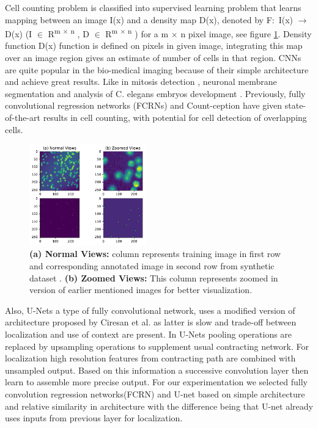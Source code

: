 \documentclass[conference]{IEEEtran}
\begin{document}
Cell counting \cite{b13} problem is classified into supervised learning problem that learns mapping between an image I(x) and a density map D(x), denoted by F$\colon$ I(x) $\rightarrow$ D(x) (I $\in$ R\textsuperscript{m $\times$ n} , D $\in$ R\textsuperscript{m $\times$ n} ) for a m $\times$ n pixel image, see figure \ref{fig2}. Density function D(x) function is defined on pixels in given image, integrating this map over an image region gives an estimate of number of cells in that region.  CNNs \cite{b23, b24} are quite popular in the bio-medical imaging because of their simple architecture and achieve great results. Like in mitosis detection \cite{b26}, neuronal membrane segmentation \cite{b25} and analysis of C. elegans embryos development \cite{b27}. Previously, fully convolutional regression networks (FCRNs) and Count-ception have given state-of-the-art results in cell counting, with potential for cell detection of overlapping cells.

\begin{figure}[!h]
\centering
\includegraphics[width=0.45\textwidth]{assets/synthetic-cells-fig.pdf}
\caption{ \textbf{(a) Normal Views: } column represents training image in first row and corresponding annotated image in second row from synthetic dataset \cite{b28}. \textbf{(b) Zoomed Views: } This column represents zoomed in version of earlier mentioned images for better visualization.}
\label{fig2}
\end{figure}

Also, U-Nets \cite{b8} a type of fully convolutional network, uses a modified version of architecture proposed by Ciresan et al. \cite{b25} as latter is slow and trade-off between localization and use of context are present. In U-Nets pooling operations are replaced by upsampling operations to supplement usual contracting network. For localization high resolution features from contracting path are combined with unsampled output. Based on this information a successive convolution layer then learn to assemble more precise output. For our experimentation we selected fully convolution regression networks(FCRN) and U-net based on simple architecture and relative similarity in architecture with the difference being that U-net already uses inputs from previous layer for localization.
\end{document}
